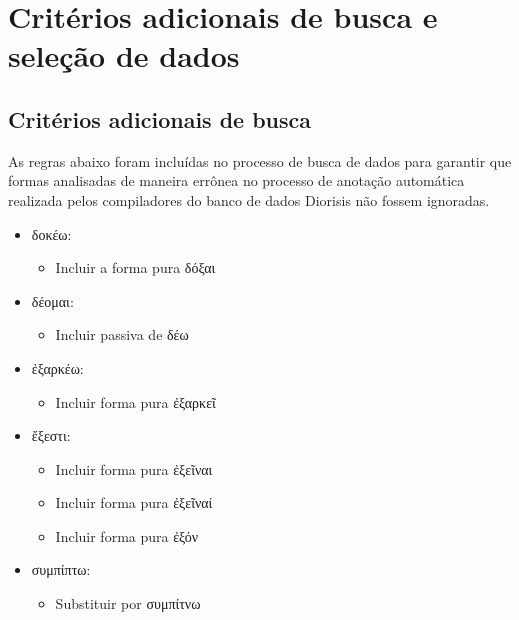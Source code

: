 \hypertarget{crituxe9rios-adicionais-de-busca-e-seleuxe7uxe3o-de-dados}{%
\section{Critérios adicionais de busca e seleção de
dados}\label{crituxe9rios-adicionais-de-busca-e-seleuxe7uxe3o-de-dados}}

\hypertarget{crituxe9rios-adicionais-de-busca}{%
\subsection{Critérios adicionais de
busca}\label{crituxe9rios-adicionais-de-busca}}

As regras abaixo foram incluídas no processo de busca de dados para
garantir que formas analisadas de maneira errônea no processo de
anotação automática realizada pelos compiladores do banco de dados
Diorisis não fossem ignoradas.

\begin{itemize}
\tightlist
\item
  δοκέω:

  \begin{itemize}
  \tightlist
  \item
    Incluir a forma pura δόξαι
  \end{itemize}
\item
  δέομαι:

  \begin{itemize}
  \tightlist
  \item
    Incluir passiva de δέω
  \end{itemize}
\item
  ἐξαρκέω:

  \begin{itemize}
  \tightlist
  \item
    Incluir forma pura ἐξαρκεῖ
  \end{itemize}
\item
  ἔξεστι:

  \begin{itemize}
  \tightlist
  \item
    Incluir forma pura ἐξεῖναι
  \item
    Incluir forma pura ἐξεῖναί
  \item
    Incluir forma pura ἐξόν
  \end{itemize}
\item
  συμπίπτω:

  \begin{itemize}
  \tightlist
  \item
    Substituir por συμπίτνω
  \end{itemize}
\end{itemize}

